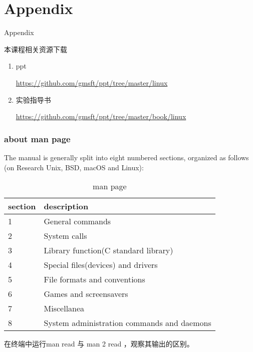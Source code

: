 \documentclass{beamer}
\begin{document}
\section{Appendix}
\begin{frame}
\Huge{\centerline{Appendix}}
\end{frame}
\begin{frame}{本课程相关资源下载}
\begin{enumerate}
\item
ppt

\url{https://github.com/gmsft/ppt/tree/master/linux}
\item
实验指导书

\url{https://github.com/gmsft/ppt/tree/master/book/linux}
\end{enumerate}
\end{frame}
\begin{frame}
\frametitle{about man page}
The manual is generally split into eight numbered sections, organized as follows (on Research Unix, BSD, macOS and Linux):
\begin{table}
\begin{tabular}{ll}
\toprule
\textbf{section} & \textbf{description} \\
\midrule
1 & General commands\\
2 & System calls\\
3 & Library function(C standard library)\\
4 & Special files(devices) and drivers\\
5 & File formats and conventions\\
6 & Games and screensavers\\
7 & Miscellanea\\
8 & System administration commands and daemons\\  
\bottomrule
\end{tabular}
\caption{man page}
\end{table}

在终端中运行man read 与 man 2 read ，观察其输出的区别。
\end{frame}
\end{document}
